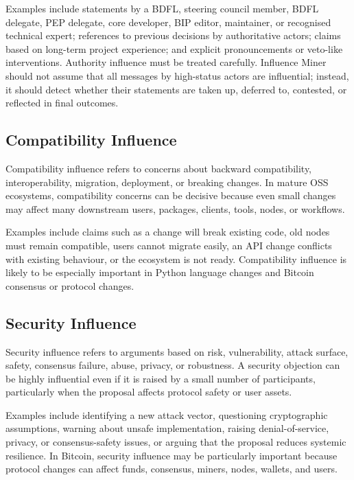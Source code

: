 \documentclass[sigconf,screen]{acmart}
\begin{document}
Examples include statements by a BDFL, steering council member, BDFL delegate, PEP delegate, core developer, BIP editor, maintainer, or recognised technical expert; references to previous decisions by authoritative actors; claims based on long-term project experience; and explicit pronouncements or veto-like interventions. Authority influence must be treated carefully. Influence Miner should not assume that all messages by high-status actors are influential; instead, it should detect whether their statements are taken up, deferred to, contested, or reflected in final outcomes.

\subsection{Compatibility Influence}

Compatibility influence refers to concerns about backward compatibility, interoperability, migration, deployment, or breaking changes. In mature OSS ecosystems, compatibility concerns can be decisive because even small changes may affect many downstream users, packages, clients, tools, nodes, or workflows.

Examples include claims such as a change will break existing code, old nodes must remain compatible, users cannot migrate easily, an API change conflicts with existing behaviour, or the ecosystem is not ready. Compatibility influence is likely to be especially important in Python language changes and Bitcoin consensus or protocol changes.

\subsection{Security Influence}

Security influence refers to arguments based on risk, vulnerability, attack surface, safety, consensus failure, abuse, privacy, or robustness. A security objection can be highly influential even if it is raised by a small number of participants, particularly when the proposal affects protocol safety or user assets.

Examples include identifying a new attack vector, questioning cryptographic assumptions, warning about unsafe implementation, raising denial-of-service, privacy, or consensus-safety issues, or arguing that the proposal reduces systemic resilience. In Bitcoin, security influence may be particularly important because protocol changes can affect funds, consensus, miners, nodes, wallets, and users.
\end{document}

